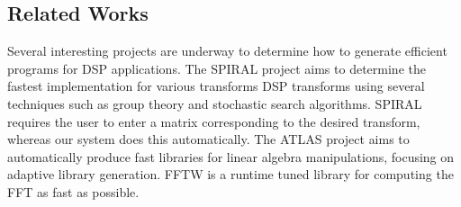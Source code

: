 \subsection{Related Works}
Several interesting projects are underway to determine how to generate efficient programs
for DSP applications. The SPIRAL project\cite{spiral, xiong-thesis,xiong01spl,johnson01searching,egner01automatic} 
aims to determine the fastest implementation for various transforms DSP transforms
using several techniques such as group theory and stochastic search algorithms. SPIRAL
requires the user to enter a matrix corresponding to the desired transform, whereas our
system does this automatically. 
The ATLAS project \cite{whaley01automated} aims to automatically produce fast
libraries for linear algebra manipulations, focusing on adaptive library generation. 
FFTW \cite{frigo99fast, fftw} is a runtime tuned library for computing the FFT as
fast as possible.


